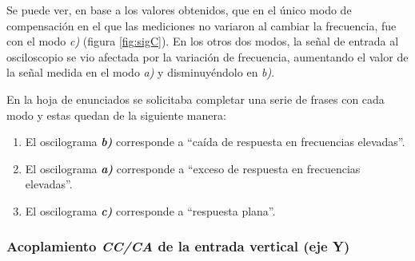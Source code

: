 \begin{table}[H]
    \centering
        \def\tablename{Tabla} 
        \caption{Barrido en frecuencia para las distintas compensaciones}
        \label{tab:BarrFrec}
\end{table}

Se puede ver, en base a los valores obtenidos, que en el único modo de compensación en el que las mediciones no variaron al cambiar la frecuencia, fue con el modo \textit{c)} (figura \ref{fig:sigC}). En los otros dos modos, la señal de entrada al osciloscopio se vio afectada por la variación de frecuencia, aumentando el valor de la señal medida en el modo \textit{a)} y disminuyéndolo en \textit{b)}.

En la hoja de enunciados se solicitaba completar una serie de frases con cada modo y estas quedan de la siguiente manera:

\begin{enumerate}
    \item El oscilograma \textbf{\textit{b)}} corresponde a “caída de respuesta en frecuencias elevadas”.
    \item El oscilograma \textit{\textbf{a)}} corresponde a “exceso de respuesta en frecuencias elevadas”.
    \item El oscilograma \textbf{\textit{c)}} corresponde a “respuesta plana”.
\end{enumerate}





\vspace{0.5cm}
\subsubsection{Acoplamiento \textit{CC/CA} de la entrada vertical (eje Y)}


